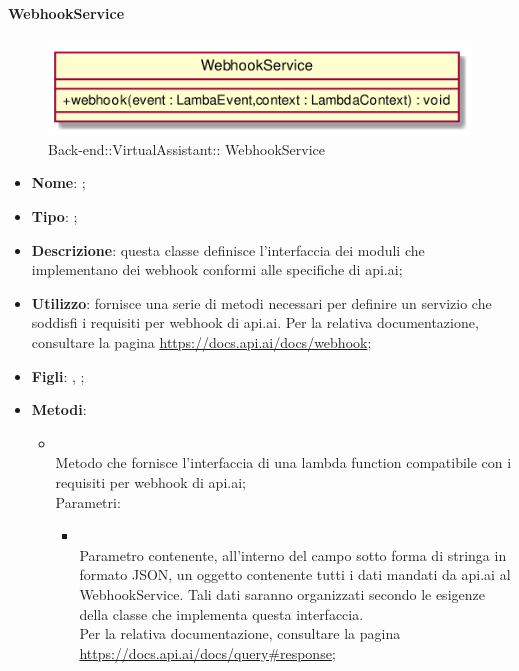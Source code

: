 \hypertarget{ WebhookService_label}{\paragraph{ WebhookService}}
\begin{figure}[h]
	\centering
	\includegraphics[width=\textwidth,height=\textheight,keepaspectratio]{images/Class_WebhookService.png}
	\caption{Back-end::VirtualAssistant:: WebhookService}
\end{figure}
\begin{itemize}
	\item \textbf{Nome}: ;
	\item \textbf{Tipo}: ;
	\item \textbf{Descrizione}: questa classe definisce l'interfaccia dei moduli che implementano dei webhook conformi alle specifiche di api.ai;
	\item \textbf{Utilizzo}: fornisce una serie di metodi necessari per definire un servizio che soddisfi i requisiti per webhook di api.ai.
Per la relativa documentazione, consultare la pagina \url{https://docs.api.ai/docs/webhook};
	\item \textbf{Figli}: , ;
	\item \textbf{Metodi}:
	\begin{itemize}
		\item[]  \\
		Metodo che fornisce l'interfaccia di una lambda function compatibile con i requisiti per webhook di api.ai;\\
		Parametri:
		\begin{itemize}
			\item {} \\
			Parametro contenente, all'interno del campo  sotto forma di stringa in formato JSON, un oggetto contenente tutti i dati mandati da api.ai al WebhookService. Tali dati saranno organizzati secondo le esigenze della classe che implementa questa interfaccia.\\
Per la relativa documentazione, consultare la pagina \url{https://docs.api.ai/docs/query#response};

\end{itemize}
\end{itemize}
\end{itemize}
